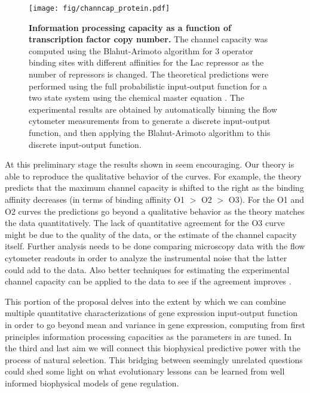 \begin{figure}[h!]
	\centering \texttt{[image: fig/channcap\_protein.pdf]}
	\caption{{\bf Information processing capacity as a function of transcription
	factor copy number.} The channel capacity was computed using the
	Blahut-Arimoto algorithm \cite{Blahut1972} for 3 operator binding sites with
	different affinities for the Lac repressor as the number of repressors is
	changed. The theoretical predictions were performed using the full
	probabilistic input-output function for a two state system using the chemical
	master equation \cite{Shahrezaei2008}. The experimental results are obtained
	by automatically binning the flow cytometer measurements from
	 to generate a discrete input-output function, and
	then applying the Blahut-Arimoto algorithm to this discrete input-output
	function.}
	\label{fig:channcap}
\end{figure}

At this preliminary stage the results shown in  seem
encouraging. Our theory is able to reproduce the qualitative behavior of the
curves. For example, the theory predicts that the maximum channel capacity is
shifted to the right as the binding affinity decreases (in terms of binding
affinity O1 $>$ O2 $>$ O3). For the O1 and O2 curves the predictions go beyond a
qualitative behavior as the theory matches the data quantitatively. The lack of
quantitative agreement for the O3 curve might be due to the quality of the data,
or the estimate of the channel capacity itself. Further analysis needs to be
done comparing microscopy data with the flow cytometer readouts in order to
analyze the instrumental noise that the latter could add to the data. Also
better techniques for estimating the experimental channel capacity can be
applied to the data to see if the agreement improves \cite{Cheong2011}.

This portion of the proposal delves into the extent by which we can combine
multiple quantitative characterizations of gene expression input-output function
in order to go beyond mean and variance in gene expression, computing from first
principles information processing capacities as the parameters in
 are tuned. In the third and last aim we will connect this
biophysical predictive power with the process of natural selection. This
bridging between seemingly unrelated questions could shed some light on what
evolutionary lessons can be learned from well informed biophysical models of
gene regulation.
